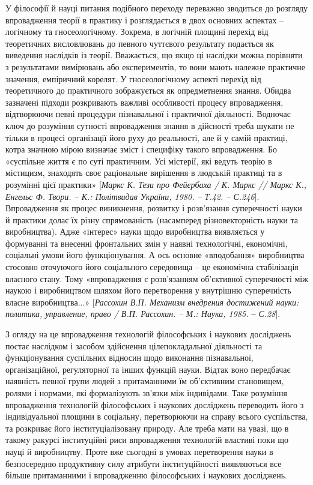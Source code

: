 У філософії й науці питання подібного переходу переважно зводиться до
розгляду впровадження теорії в практику і розглядається в двох основних
аспектах – логічному та гносеологічному. Зокрема, в логічній площині перехід
від теоретичних висловлювань до певного чуттєвого результату подається як
виведення наслідків із теорії. Вважається, що якщо ці наслідки можна
порівняти з результатами вимірювань або експериментів, то вони мають
належне практичне значення, емпіричний корелят. У гносеологічному аспекті
перехід від теоретичного до практичного зображується як опредметнення
знання. Обидва зазначені підходи розкривають важливі особливості процесу
впровадження, відтворюючи певні процедури пізнавальної і практичної
діяльності. Водночас ключ до розуміння сутності впровадження знання в
дійсності треба шукати не тільки в процесі організації його руху до реальності,
але й у самій практиці, котра значною мірою визначає зміст і специфіку такого
впровадження. Бо «суспільне життя є по суті практичним. Усі містерії, які
ведуть теорію в містицизм, знаходять своє раціональне вирішення в людській
практиці та в розумінні цієї практики» [\textit{Маркс К. Тези про Фейєрбаха / К. Маркс
// Маркс К., Енгельс Ф. Твори. – К.: Політвидав України, 1980. – Т.42. – С.246}].
Впровадження як процес виникнення, розвитку і розв’язання суперечності
науки й практики долає їх різну спрямованість (насамперед різновекторність
науки та виробництва). Адже «інтерес» науки щодо виробництва виявляється у
формуванні та внесенні фронтальних змін у наявні технологічні, економічні,
соціальні умови його функціонування. А ось основне «вподобання»
виробництва стосовно оточуючого його соціального середовища – це
економічна стабілізація власного стану. Тому «впровадження є розв’язанням
об’єктивної суперечності між наукою і виробництвом шляхом його
перетворення у внутрішню суперечність власне виробництва...» [\textit{Рассохин В.П.
Механизм внедрения достижений науки: политика, управление, право / В.П.
Рассохин. – М.: Наука, 1985. ‒ С.28}].

З огляду на це впровадження технологій філософських і наукових
досліджень постає наслідком і засобом здійснення цілепокладальної діяльності
та функціонування суспільних відносин щодо виконання пізнавальної,
організаційної, регуляторної та інших функцій науки. Відтак воно передбачає
наявність певної групи людей з притаманними їм об’єктивним становищем,
ролями і нормами, які формалізують зв’язки між індивідами. Таке розуміння
впровадження технологій філософських і наукових досліджень переводить його
з індивідуальної площини в соціальну, перетворюючи на справу всього
суспільства, та розкриває його інституціалізовану природу. Але треба мати на
увазі, що в такому ракурсі інституційні риси впровадження технологій властиві
поки що науці й виробництву. Проте вже сьогодні в умовах перетворення науки
в безпосередню продуктивну силу атрибути інституційності виявляються все
більше притаманними і впровадженню філософських і наукових досліджень.

